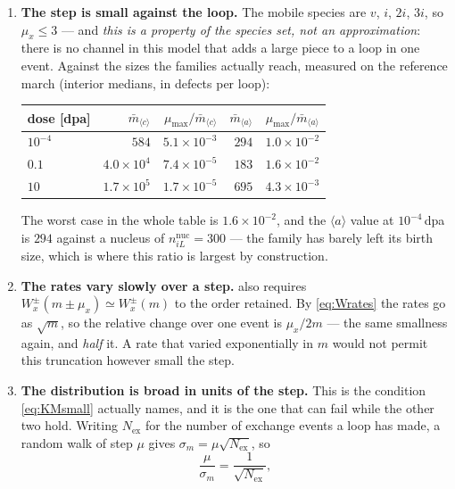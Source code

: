 \documentclass{article}
\newcommand{\aloop}{\ensuremath{\langle a\rangle}}
\newcommand{\cloop}{\ensuremath{\langle c\rangle}}
\begin{document}
\begin{enumerate}
\item \textbf{The step is small against the loop.} The mobile species are $v$,
      $i$, $2i$, $3i$, so $\mu_x\le3$ --- and \emph{this is a property of the
      species set, not an approximation}: there is no channel in this model that
      adds a large piece to a loop in one event. Against the sizes the families
      actually reach, measured on the reference march (interior medians, in
      defects per loop):
      \begin{center}\small
      \begin{tabular}{@{}lrrrr@{}}
      \toprule
      dose [dpa] & $\bar m_{\cloop{}}$ & $\mu_{\max}/\bar m_{\cloop{}}$
                 & $\bar m_{\aloop{}}$ & $\mu_{\max}/\bar m_{\aloop{}}$\\
      \midrule
      $10^{-4}$ & $584$ & $5.1\times10^{-3}$ & $294$ & $1.0\times10^{-2}$\\
      $0.1$ & $4.0\times10^{4}$ & $7.4\times10^{-5}$ & $183$ & $1.6\times10^{-2}$\\
      $10$ & $1.7\times10^{5}$ & $1.7\times10^{-5}$ & $695$ & $4.3\times10^{-3}$\\
      \bottomrule
      \end{tabular}
      \end{center}
      The worst case in the whole table is $1.6\times10^{-2}$, and the \aloop{}
      value at $10^{-4}\,$dpa is $294$ against a nucleus of
      $n^{\mathrm{nuc}}_{iL}=300$ --- the family has barely left its birth size,
      which is where this ratio is largest by construction.
\item \textbf{The rates vary slowly over a step.}  also requires
      $W^{\pm}_x(m\pm\mu_x)\simeq W^{\pm}_x(m)$ to the order retained. By
      \cref{eq:Wrates} the rates go as $\sqrt m$, so the relative change over one
      event is $\mu_x/2m$ --- the same smallness again, and \emph{half} it. A
      rate that varied exponentially in $m$ would not permit this truncation
      however small the step.
\item \textbf{The distribution is broad in units of the step.} This is the
      condition \cref{eq:KMsmall} actually names, and it is the one that can fail
      while the other two hold. Writing $N_{\mathrm{ex}}$ for the number of
      exchange events a loop has made, a random walk of step $\mu$ gives
      $\sigma_m=\mu\sqrt{N_{\mathrm{ex}}}$, so
      \begin{equation}
        \frac{\mu}{\sigma_m}=\frac{1}{\sqrt{N_{\mathrm{ex}}}},

\end{equation}
\end{enumerate}
\end{document}
